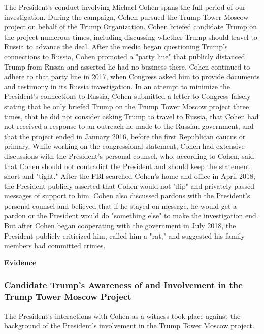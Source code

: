 The President's conduct involving Michael Cohen spans the full period of our investigation.
During the campaign, Cohen pursued the Trump Tower Moscow project on behalf of the Trump Organization.
Cohen briefed candidate Trump on the project numerous times, including discussing whether Trump should travel to Russia to advance the deal.
After the media began questioning Trump's connections to Russia, Cohen promoted a "party line" that publicly distanced Trump from Russia and asserted he had no business there.
Cohen continued to adhere to that party line in 2017, when Congress asked him to provide documents and testimony in its Russia investigation.
In an attempt to minimize the President's connections to Russia, Cohen submitted a letter to Congress falsely stating that he only briefed Trump on the Trump Tower Moscow project three times, that he did not consider asking Trump to travel to Russia, that Cohen had not received a response to an outreach he made to the Russian government, and that the project ended in January 2016, before the first Republican caucus or primary.
While working on the congressional statement, Cohen had extensive discussions with the President's personal counsel, who, according to Cohen, said that Cohen should not contradict the President and should keep the statement short and "tight."
After the FBI searched Cohen's home and office in April 2018, the President publicly asserted that Cohen would not "flip" and privately passed messages of support to him.
Cohen also discussed pardons with the President's personal counsel and believed that if he stayed on message, he would get a pardon or the President would do "something else" to make the investigation end.
But after Cohen began cooperating with the government in July 2018, the President publicly criticized him, called him a "rat," and suggested his family members had committed crimes.

\begin{center}
\textbf{Evidence}
\end{center}

\subsubsection{Candidate Trump's Awareness of and Involvement in the Trump Tower Moscow Project}

The President's interactions with Cohen as a witness took place against the background of the President's involvement in the Trump Tower Moscow project.

